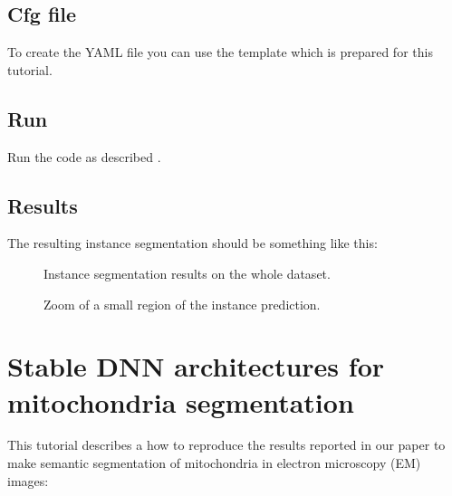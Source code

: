 \documentclass[letterpaper,10pt,english]{sphinxmanual}
\begin{document}
\subsection{Cfg file}
\label{\detokenize{tutorials/nucleus:cfg-file}}
To create the YAML file you can use the template  which is prepared for this tutorial.


\subsection{Run}
\label{\detokenize{tutorials/nucleus:run}}
Run the code as described .


\subsection{Results}
\label{\detokenize{tutorials/nucleus:results}}
The resulting instance segmentation should be something like this:

\begin{figure}[htbp]
\centering
\capstart

\noindent{}
\caption{Instance segmentation results on the whole dataset.}\label{\detokenize{tutorials/nucleus:id7}}\end{figure}

\begin{figure}[htbp]
\centering
\capstart

\noindent{}
\caption{Zoom of a small region of the instance prediction.}\label{\detokenize{tutorials/nucleus:id8}}\end{figure}


\section{Stable DNN architectures for mitochondria segmentation}
\label{\detokenize{manuscripts/stable_mitochondria:stable-dnn-architectures-for-mitochondria-segmentation}}\label{\detokenize{manuscripts/stable_mitochondria::doc}}
This tutorial describes a how to reproduce the results reported in our paper to
make semantic segmentation of mitochondria in electron microscopy (EM) images:
\end{document}
